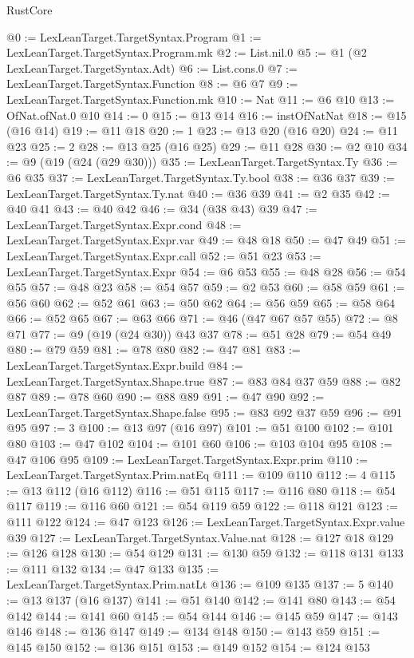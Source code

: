 \begin{lexlean}{RustCore}
\begin{coremodule}
@0 := LexLeanTarget.TargetSyntax.Program
@1 := LexLeanTarget.TargetSyntax.Program.mk
@2 := List.nil.{0}
@5 := @1 (@2 LexLeanTarget.TargetSyntax.Adt)
@6 := List.cons.{0}
@7 := LexLeanTarget.TargetSyntax.Function
@8 := @6 @7
@9 := LexLeanTarget.TargetSyntax.Function.mk
@10 := Nat
@11 := @6 @10
@13 := OfNat.ofNat.{0} @10
@14 := 0
@15 := @13 @14
@16 := instOfNatNat
@18 := @15 (@16 @14)
@19 := @11 @18
@20 := 1
@23 := @13 @20 (@16 @20)
@24 := @11 @23
@25 := 2
@28 := @13 @25 (@16 @25)
@29 := @11 @28
@30 := @2 @10
@34 := @9 (@19 (@24 (@29 @30)))
@35 := LexLeanTarget.TargetSyntax.Ty
@36 := @6 @35
@37 := LexLeanTarget.TargetSyntax.Ty.bool
@38 := @36 @37
@39 := LexLeanTarget.TargetSyntax.Ty.nat
@40 := @36 @39
@41 := @2 @35
@42 := @40 @41
@43 := @40 @42
@46 := @34 (@38 @43) @39
@47 := LexLeanTarget.TargetSyntax.Expr.cond
@48 := LexLeanTarget.TargetSyntax.Expr.var
@49 := @48 @18
@50 := @47 @49
@51 := LexLeanTarget.TargetSyntax.Expr.call
@52 := @51 @23
@53 := LexLeanTarget.TargetSyntax.Expr
@54 := @6 @53
@55 := @48 @28
@56 := @54 @55
@57 := @48 @23
@58 := @54 @57
@59 := @2 @53
@60 := @58 @59
@61 := @56 @60
@62 := @52 @61
@63 := @50 @62
@64 := @56 @59
@65 := @58 @64
@66 := @52 @65
@67 := @63 @66
@71 := @46 (@47 @67 @57 @55)
@72 := @8 @71
@77 := @9 (@19 (@24 @30)) @43 @37
@78 := @51 @28
@79 := @54 @49
@80 := @79 @59
@81 := @78 @80
@82 := @47 @81
@83 := LexLeanTarget.TargetSyntax.Expr.build
@84 := LexLeanTarget.TargetSyntax.Shape.true
@87 := @83 @84 @37 @59
@88 := @82 @87
@89 := @78 @60
@90 := @88 @89
@91 := @47 @90
@92 := LexLeanTarget.TargetSyntax.Shape.false
@95 := @83 @92 @37 @59
@96 := @91 @95
@97 := 3
@100 := @13 @97 (@16 @97)
@101 := @51 @100
@102 := @101 @80
@103 := @47 @102
@104 := @101 @60
@106 := @103 @104 @95
@108 := @47 @106 @95
@109 := LexLeanTarget.TargetSyntax.Expr.prim
@110 := LexLeanTarget.TargetSyntax.Prim.natEq
@111 := @109 @110
@112 := 4
@115 := @13 @112 (@16 @112)
@116 := @51 @115
@117 := @116 @80
@118 := @54 @117
@119 := @116 @60
@121 := @54 @119 @59
@122 := @118 @121
@123 := @111 @122
@124 := @47 @123
@126 := LexLeanTarget.TargetSyntax.Expr.value @39
@127 := LexLeanTarget.TargetSyntax.Value.nat
@128 := @127 @18
@129 := @126 @128
@130 := @54 @129
@131 := @130 @59
@132 := @118 @131
@133 := @111 @132
@134 := @47 @133
@135 := LexLeanTarget.TargetSyntax.Prim.natLt
@136 := @109 @135
@137 := 5
@140 := @13 @137 (@16 @137)
@141 := @51 @140
@142 := @141 @80
@143 := @54 @142
@144 := @141 @60
@145 := @54 @144
@146 := @145 @59
@147 := @143 @146
@148 := @136 @147
@149 := @134 @148
@150 := @143 @59
@151 := @145 @150
@152 := @136 @151
@153 := @149 @152
@154 := @124 @153

\end{coremodule}
\end{lexlean}
